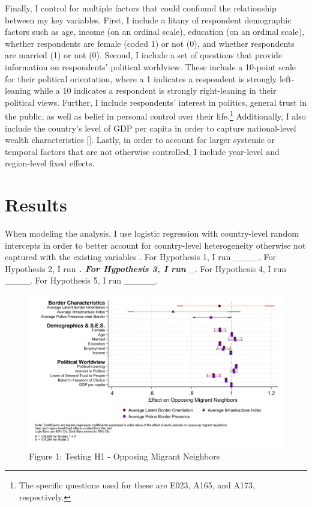 \documentclass[12pt,]{article}
\begin{document}
Finally, I control for multiple factors that could confound the
relationship between my key variables. First, I include a litany of
respondent demographic factors such as age, income (on an ordinal
scale), education (on an ordinal scale), whether respondents are female
(coded 1) or not (0), and whether respondents are married (1) or not
(0). Second, I include a set of questions that provide information on
respondents' political worldview. These include a 10-point scale for
their political orientation, where a 1 indicates a respondent is
strongly left-leaning while a 10 indicates a respondent is strongly
right-leaning in their political views. Further, I include respondents'
interest in politics, general trust in the public, as well as belief in
personal control over their life.\footnote{The specific questions used
  for these are E023, A165, and A173, respectively.} Additionally, I
also include the country's level of GDP per capita in order to capture
national-level wealth characteristics {[}{]}. Lastly, in order to
account for larger systemic or temporal factors that are not otherwise
controlled, I include year-level and region-level fixed effects.

\section{Results}\label{results}

When modeling the analysis, I use logistic regression with country-level
random intercepts in order to better account for country-level
heterogeneity otherwise not captured with the existing variables
\citep{bell2015}. For Hypothesis 1, I run \_\_\_\_. For Hypothesis 2, I
run \textbf{\emph{. For Hypothesis 3, I run }}\_. For Hypothesis 4, I
run \_\_\_\_. For Hypothesis 5, I run \_\_\_\_\_.

\begin{figure}
\centering
\includegraphics{figures/border_orientation_figure1.png}
\caption{Figure 1: Testing H1 - Opposing Migrant Neighbors}
\end{figure}
\end{document}
